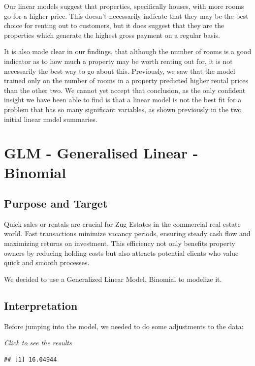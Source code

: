 \documentclass[
]{article}
\begin{document}
Our linear models suggest that properties, specifically houses, with
more rooms go for a higher price. This doesn't necessarily indicate that
they may be the best choice for renting out to customers, but it does
suggest that they are the properties which generate the highest gross
payment on a regular basis.

It is also made clear in our findings, that although the number of rooms
is a good indicator as to how much a property may be worth renting out
for, it is not necessarily the best way to go about this. Previously, we
saw that the model trained only on the number of rooms in a property
predicted higher rental prices than the other two. We cannot yet accept
that conclusion, as the only confident insight we have been able to find
is that a linear model is not the best fit for a problem that has so
many significant variables, as shown previously in the two initial
linear model summaries.

\section{GLM - Generalised Linear -
Binomial}\label{glm---generalised-linear---binomial}

\subsection{Purpose and Target}\label{purpose-and-target-1}

Quick sales or rentals are crucial for Zug Estates in the commercial
real estate world. Fast transactions minimize vacancy periods, ensuring
steady cash flow and maximizing returns on investment. This efficiency
not only benefits property owners by reducing holding costs but also
attracts potential clients who value quick and smooth processes.

We decided to use a Generalized Linear Model, Binomial to modelize it.

\subsection{Interpretation}\label{interpretation-1}

Before jumping into the model, we needed to do some adjustments to the
data:

\emph{Click to see the results}

\begin{verbatim}
## [1] 16.04944
\end{verbatim}
\end{document}
